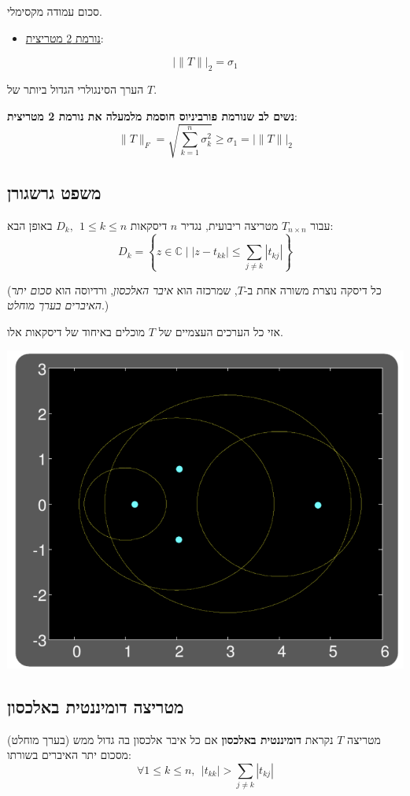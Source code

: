 \documentclass[11pt]{article}
\begin{document}
סכום עמודה מקסימלי.

\begin{itemize}
\item \uline{נורמת 2 מטריצית}:
\end{itemize}

\[
\left| \|T\| \right|_2 = \sigma_1
\]

הערך הסינגולרי הגדול ביותר של \(T\).

\textbf{נשים לב שנורמת פורביניוס חוסמת מלמעלה את נורמת 2 מטריצית}:
\[
\|T\|_F =  \sqrt{\sum_{k=1}^n \sigma_k^2} \ge \sigma_1 =  \left| \|T\| \right|_2
\]

\subsection{משפט גרשגורן}
\label{sec:org42a68fd}

עבור \(T_{n \times n}\) מטריצה ריבועית, נגדיר \(n\) דיסקאות \(D_k,\ \ 1 \le k \le n\) באופן הבא:
\[
D_k
=
\left\{ z \in \mathbb{C} \mid \left| z - t_{kk} \right|
\le \sum_{j \ne k} \left| t_{kj} \right| \right\}
\]

(כל דיסקה נוצרת משורה אחת ב-\(T\), שמרכזה הוא \emph{איבר האלכסון}, ורדיוסה הוא \emph{סכום יתר האיברים בערך מוחלט}.)

אזי כל הערכים העצמיים של \(T\) מוכלים באיחוד של דיסקאות אלו.

\begin{center}
\includegraphics[width=.9\linewidth]{./img/gershgoren-representation.png}
\end{center}

\subsection{מטריצה דומיננטית באלכסון}
\label{sec:org547597a}
מטריצה \(T\) נקראת \textbf{דומיננטית באלכסון} אם כל איבר אלכסון בה גדול ממש (בערך מוחלט) מסכום יתר האיברים בשורתו:
\[
\forall 1 \le k \le n,\ \ \left| t_{kk} \right|  > \sum_{j \ne k} \left| t_{kj} \right|
\]
\end{document}
